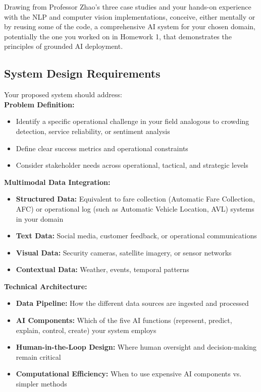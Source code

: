 \documentclass[11pt]{article}
\begin{document}
Drawing from Professor Zhao's three case studies and your hands-on experience with the NLP and computer vision implementations, conceive, either mentally or by reusing some of the code, a comprehensive AI system for your chosen domain, potentially the one you worked on in Homework 1, that demonstrates the principles of grounded AI deployment.

\subsection*{System Design Requirements}
Your proposed system should address:\\

\noindent\textbf{Problem Definition:}
\begin{itemize}
\item Identify a specific operational challenge in your field analogous to crowding detection, service reliability, or sentiment analysis
\item Define clear success metrics and operational constraints
\item Consider stakeholder needs across operational, tactical, and strategic levels
\end{itemize}

\noindent\textbf{Multimodal Data Integration:}
\begin{itemize}
\item \textbf{Structured Data:} Equivalent to fare collection (Automatic Fare Collection, AFC) or operational log (such as Automatic Vehicle Location, AVL) systems in your domain
\item \textbf{Text Data:} Social media, customer feedback, or operational communications
\item \textbf{Visual Data:} Security cameras, satellite imagery, or sensor networks
\item \textbf{Contextual Data:} Weather, events, temporal patterns
\end{itemize}

\noindent\textbf{Technical Architecture:}
\begin{itemize}
\item \textbf{Data Pipeline:} How the different data sources are ingested and processed
\item \textbf{AI Components:} Which of the five AI functions (represent, predict, explain, control, create) your system employs
\item \textbf{Human-in-the-Loop Design:} Where human oversight and decision-making remain critical
\item \textbf{Computational Efficiency:} When to use expensive AI components vs. simpler methods
\end{itemize}
\end{document}
